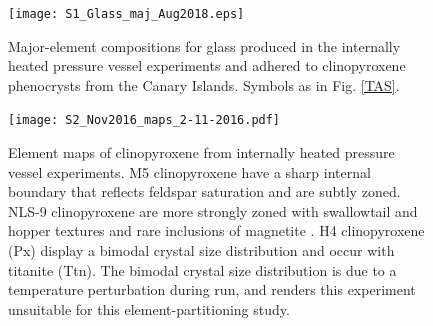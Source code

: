 \documentclass[review,authoryear,12pt]{elsarticle}
\begin{document}
\begin{figure}
\begin{center}
\texttt{[image: S1\_Glass\_maj\_Aug2018.eps]}
\caption{Major-element compositions for glass produced in the internally heated pressure vessel experiments and adhered to clinopyroxene phenocrysts from the Canary Islands. Symbols as in Fig. \ref{TAS}.}
\label{S2_glass}
\end{center}
\end{figure}


\begin{figure}
\begin{center}
\texttt{[image: S2\_Nov2016\_maps\_2-11-2016.pdf]}
\caption[Element maps of clinopyroxene from internally heated pressure vessel experiments]{Element maps of clinopyroxene from internally heated pressure vessel experiments. M5 clinopyroxene have a sharp internal boundary that reflects feldspar saturation and are subtly zoned. NLS-9 clinopyroxene are more strongly zoned with swallowtail and hopper textures and rare inclusions of magnetite \citep[cf.][]{Walker1976, Lofgren1989,Shea2013}. H4 clinopyroxene (Px) display a bimodal crystal size distribution and occur with titanite (Ttn). The bimodal crystal size distribution is due to a temperature perturbation during run, and renders this experiment unsuitable for this element-partitioning study.}
\label{ElementMap_Supplement}
\end{center}
\end{figure}

\end{document}
